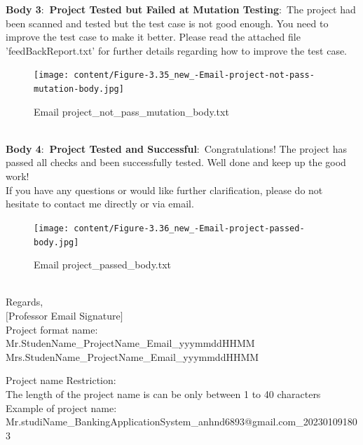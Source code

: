 \textbf{Body 3$:$ Project Tested but Failed at Mutation Testing$:$} The project had been scanned and tested but the test case is not good enough. You need to improve the test case to make it better. Please read the attached file 'feedBackReport.txt' for further details regarding how to improve the test case.\\
\begin{figure}[h!]
	\centering
	\texttt{[image: content/Figure-3.35\_new\_-Email-project-not-pass-mutation-body.jpg]}
	\caption{Email project\_not\_pass\_mutation\_body.txt}
	\label{fig:f11}
\end{figure}\\
\newpage
\textbf{Body 4$:$ Project Tested and Successful$:$} Congratulations! The project has passed all checks and been successfully tested. Well done and keep up the good work!\\
If you have any questions or would like further clarification, please do not hesitate to contact me directly or via email. \\
\begin{figure}[h!]
	\centering
	\texttt{[image: content/Figure-3.36\_new\_-Email-project-passed-body.jpg]}
	\caption{Email project\_passed\_body.txt}
	\label{fig:f11}
\end{figure}\\
Regards,\\
$[$Professor Email Signature$]$ \\ 


\newpage
Project format name: \\ 
Mr.StudenName\_ProjectName\_Email\_yyymmddHHMM\\
Mrs.StudenName\_ProjectName\_Email\_yyymmddHHMM
\newline

Project name Restriction: \\ 
The length of the project name is can be only between 1 to 40 characters\\
\newline
Example of project name: 
\\Mr.studiName\_BankingApplicationSystem\_anhnd6893@gmail.com\_202301091803
